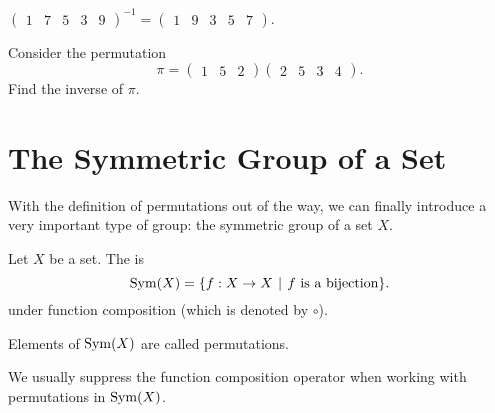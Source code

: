 \begin{example}
    $\begin{pmatrix}1 & 7 & 5 & 3 & 9\end{pmatrix}^{-1} = \begin{pmatrix}1 & 9 & 3 & 5 & 7\end{pmatrix}$.
\end{example}

\begin{exercise}
    Consider the permutation
    \[
        \pi = \begin{pmatrix}1 & 5 & 2\end{pmatrix}\begin{pmatrix}2 & 5 & 3 & 4\end{pmatrix}.
    \]
    Find the inverse of $\pi$.
\end{exercise}

\section{The Symmetric Group of a Set}
With the definition of permutations out of the way, we can finally introduce a very important type of group: the symmetric group of a set $X$.

\begin{definition}
    Let $X$ be a set. The  is
    \[
        \Sym{X} = \{f: X \to X \vert f \text{ is a bijection}\}.
    \]
    under function composition (which is denoted by $\circ$).
\end{definition}
\begin{remark}
    Elements of $\mathrm{Sym}(X)$ are called permutations.
\end{remark}
\begin{remark}
    We usually suppress the function composition operator when working with permutations in $\mathrm{Sym}(X)$.
\end{remark}

